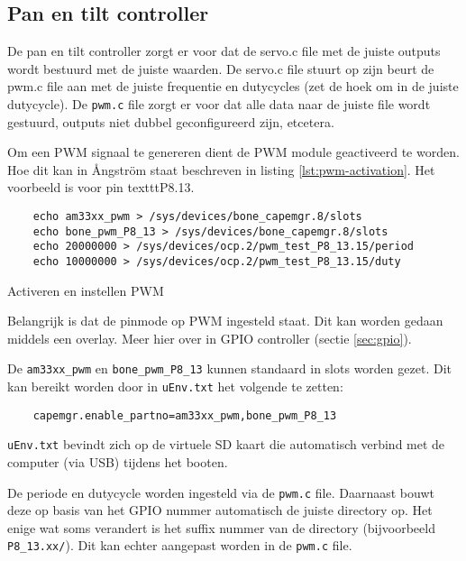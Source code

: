 \subsection{Pan en tilt controller}

De pan en tilt controller zorgt er voor dat de servo.c file met de juiste outputs
wordt bestuurd met de juiste waarden. De servo.c file stuurt op zijn beurt de pwm.c
file aan met de juiste frequentie en dutycycles (zet de hoek om in de juiste
dutycycle). De \texttt{pwm.c} file zorgt er voor dat alle data naar de juiste
file wordt gestuurd, outputs niet dubbel geconfigureerd zijn, etcetera.

Om een PWM signaal te genereren dient de PWM module geactiveerd te worden. Hoe
dit kan in Ångström staat beschreven in listing \ref{lst:pwm-activation}. Het
voorbeeld is voor pin texttt{P8.13}.

\begin{listing}
    \begin{verbatim}
    echo am33xx_pwm > /sys/devices/bone_capemgr.8/slots
    echo bone_pwm_P8_13 > /sys/devices/bone_capemgr.8/slots
    echo 20000000 > /sys/devices/ocp.2/pwm_test_P8_13.15/period
    echo 10000000 > /sys/devices/ocp.2/pwm_test_P8_13.15/duty
    \end{verbatim}
    \caption{Activeren en instellen PWM}
    \label{lst:pwm-activation}
\end{listing}


Belangrijk is dat de pinmode op PWM ingesteld staat. Dit kan worden gedaan
middels een overlay. Meer hier over in GPIO controller (sectie \ref{sec:gpio}).

De \texttt{am33xx\_pwm} en \texttt{bone\_pwm\_P8\_13} kunnen standaard in slots
worden gezet. Dit kan bereikt worden door in \texttt{uEnv.txt} het volgende te zetten:

\begin{verbatim}
    capemgr.enable_partno=am33xx_pwm,bone_pwm_P8_13
\end{verbatim}

\texttt{uEnv.txt} bevindt zich op de virtuele SD kaart die automatisch verbind
met de computer (via USB) tijdens het booten.

De periode en dutycycle worden ingesteld via de \texttt{pwm.c} file. Daarnaast
bouwt deze op basis van het GPIO nummer automatisch de juiste directory op. Het
enige wat soms verandert is het suffix nummer van de directory (bijvoorbeeld
\texttt{P8\_13.xx/}). Dit kan echter aangepast worden in de \texttt{pwm.c} file.
